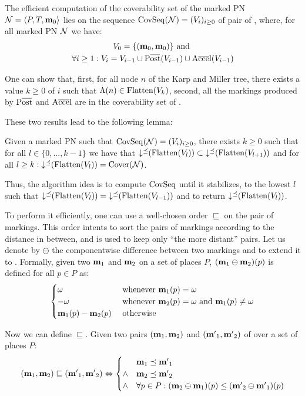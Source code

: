 The efficient computation of the coverability set of the marked \ac{PN} $\mathcal{N} = \langle P,T, \mathbf{m}_0\rangle$ lies on the sequence $\operatorname{CovSeq}(\mathcal{N}) = (V_i)_{i \geq 0}$ of pair of \omarks, where, for all marked \ac{PN} $\mathcal{N}$ we have:
\begin{gather*}
  V_0 = \{(\mari, \mari)\} \text{ and } \\
  \forall i \geq 1 : V_i = V_{i-1} \cup \Postb(V_{i-1}) \cup \Accelb(V_{i-1})
\end{gather*}

One can show that,
first, for all node $n$ of the Karp and Miller tree, there exists a value $k \geq 0$ of $i$ such that $\Lambda(n) \in \operatorname{Flatten}(V_k)$,
second, all the markings produced by $\Postb$ and $\operatorname{A\overline{cce}l}$ are in the coverability set of \N.

These two results lead to the following lemma:
\begin{lemm}
  Given a marked \ac{PN} \N such that $\operatorname{CovSeq}(\mathcal{N}) = (V_i)_{i \geq 0}$,
  there exists $k \geq 0$ such that for all $l \in \{0, ..., k-1\}$ we have that $\operatorname{\downarrow^\preceq}(\operatorname{Flatten}(V_l)) \subset \operatorname{\downarrow^\preceq}(\operatorname{Flatten}(V_{l+1}))$
  and for all $l \geq k : \operatorname{\downarrow^\preceq}(\operatorname{Flatten}(V_l)) = \operatorname{Cover}(\mathcal{N})$.
\end{lemm}

Thus, the algorithm idea is to compute $\operatorname{CovSeq}$ until it stabilizes,  to the lowest $l$ such that $\operatorname{\downarrow^\preceq}(\operatorname{Flatten}(V_l)) = \operatorname{\downarrow^\preceq}(\operatorname{Flatten}(V_{l-1}))$ and to return $\operatorname{\downarrow^\preceq}(\operatorname{Flatten}(V_l))$.

To perform it efficiently, one can use a well-chosen order $\sqsubseteq$ on the pair of markings.
This order intents to sort the pairs of markings according to the distance in between, and is used to keep only ``the more distant'' pairs.
Let us denote by $\ominus$ the componentwise difference between two markings and to extend it to \omarks.
Formally, given two \omarks $\mathbf{m}_1$ and $\mathbf{m}_2$ on a set of places $P$, $(\mathbf{m}_1 \ominus \mathbf{m}_2)(p)$ is defined for all $p \in P$ as:
\[
  \begin{cases}
    \omega & \text{ whenever } \mathbf{m}_1(p) = \omega \\
    -\omega & \text{ whenever } \mathbf{m}_2(p) = \omega \text{ and } \mathbf{m}_1(p) \neq \omega \\
    \mathbf{m}_1(p) - \mathbf{m}_2(p) & \text{ otherwise}
  \end{cases}
\]

Now we can define $\sqsubseteq$.
Given two pairs $(\mathbf{m}_1, \mathbf{m}_2)$ and $(\mathbf{m'}_1, \mathbf{m'}_2)$ of \omarks over a set of places $P$:
\[
  (\mathbf{m}_1, \mathbf{m}_2) \sqsubseteq (\mathbf{m'}_1, \mathbf{m'}_2) \Leftrightarrow
  \begin{cases}
    & \mathbf{m}_1 \preceq \mathbf{m'}_1 \\
    \wedge & \mathbf{m}_2 \preceq \mathbf{m'}_2 \\
    \wedge & \forall p \in P : (\mathbf{m}_2 \ominus \mathbf{m}_1)(p) \leq (\mathbf{m'}_2 \ominus \mathbf{m'}_1)(p)
  \end{cases}
\]

